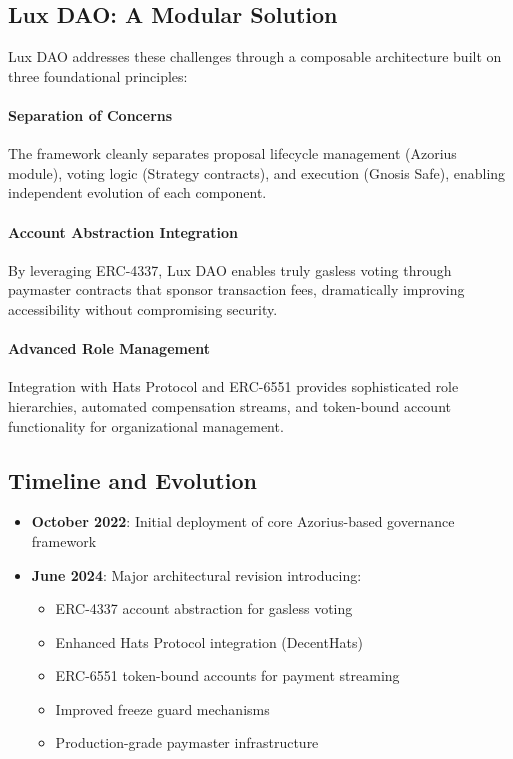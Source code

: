 \documentclass[11pt,a4paper]{article}
\begin{document}
\subsection{Lux DAO: A Modular Solution}

Lux DAO addresses these challenges through a composable architecture built on three foundational principles:

\paragraph{Separation of Concerns} The framework cleanly separates proposal lifecycle management (Azorius module), voting logic (Strategy contracts), and execution (Gnosis Safe), enabling independent evolution of each component.

\paragraph{Account Abstraction Integration} By leveraging ERC-4337, Lux DAO enables truly gasless voting through paymaster contracts that sponsor transaction fees, dramatically improving accessibility without compromising security.

\paragraph{Advanced Role Management} Integration with Hats Protocol and ERC-6551 provides sophisticated role hierarchies, automated compensation streams, and token-bound account functionality for organizational management.

\subsection{Timeline and Evolution}

\begin{itemize}
    \item \textbf{October 2022}: Initial deployment of core Azorius-based governance framework
    \item \textbf{June 2024}: Major architectural revision introducing:
    \begin{itemize}
        \item ERC-4337 account abstraction for gasless voting
        \item Enhanced Hats Protocol integration (DecentHats)
        \item ERC-6551 token-bound accounts for payment streaming
        \item Improved freeze guard mechanisms
        \item Production-grade paymaster infrastructure
    \end{itemize}
\end{itemize}
\end{document}
